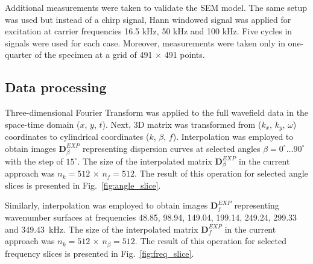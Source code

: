 \documentclass[preprint,12pt]{elsarticle}
\newcommand{\matr}[1]{\mathbf{#1}} %
\begin{document}
Additional measurements were taken to validate the SEM model. 
The same setup was used but instead of a chirp signal, Hann windowed signal was applied for excitation at carrier frequencies 16.5 kHz, 50 kHz and 100 kHz. 
Five cycles in signals were used for each case. 
Moreover, measurements were taken only in one-quarter of the specimen at a grid of 491 $\times$ 491 points.
\subsection{Data processing}
Three-dimensional Fourier Transform was applied to the full wavefield data in the space-time domain ($x$, $y$, $t$). 
Next, 3D matrix was transformed from ($k_x$, $k_y$, $\omega$) coordinates to cylindrical coordinates ($k$, $\beta$, $f$). 
Interpolation was employed to obtain images $\matr{D}_{\beta}^{EXP}$ representing dispersion curves at selected angles $\beta = 0^{\circ} \ldots 90^{\circ}$ with the step of $15^{\circ}$. 
The size of the interpolated matrix $\matr{D}_{\beta}^{EXP}$ in the current approach was $n_k=512$ $\times$ $n_f= 512$. 
The result of this operation for selected angle slices is presented in Fig.~\ref{fig:angle_slice}. 

Similarly, interpolation was employed to obtain images $\matr{D}_{f}^{EXP}$ representing wavenumber surfaces at frequencies 48.85, 98.94, 149.04, 199.14, 249.24, 299.33 and 349.43~kHz.
The size of the interpolated matrix $\matr{D}_{f}^{EXP}$ in the current approach was $n_k=512$ $\times$ $n_{\beta}= 512$.
The result of this operation for selected frequency slices is presented in Fig.~\ref{fig:freq_slice}.
\end{document}
